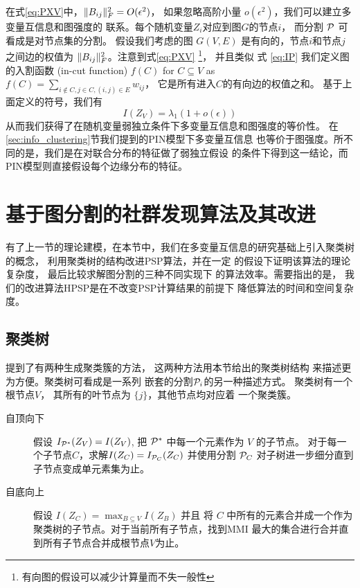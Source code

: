 在式\eqref{eq:PXV}中，$\norm{B_{ij}}_F^2 =O(\epsilon^2)$，
如果忽略高阶小量 $o(\epsilon^2)$，我们可以建立多变量互信息和图强度的
联系。每个随机变量$Z_i$对应到图$G$的节点$i$，
而分割 $\P$
可看成是对节点集的分割。
假设我们考虑的图 $G(V, E)$ 是有向的，节点$i$和节点$j$之间边的权值为
$\norm{B_{ij}}_F^2$。注意到式\eqref{eq:PXV}
\footnote{有向图的假设可以减少计算量而不失一般性}，
并且类似 式 \ref{eq:IP} 我们定义图的入割函数 (in-cut function) $f(C)$ for $C\subseteq V$ as $f(C) = \sum_{i\not\in C, j\in C, (i,j) \in E} w_{ij}$，
它是所有进入$C$的有向边的权值之和。
基于上面定义的符号，我们有
\begin{equation}\label{eq:PXV_Data_Simplified}
I(Z_V) = \lambda_1 (1 + o(\epsilon))
\end{equation}
从而我们获得了在随机变量弱独立条件下多变量互信息和图强度的等价性。
在\ref{sec:info_clustering}节我们提到的PIN模型下多变量互信息
也等价于图强度。所不同的是，我们是在对联合分布的特征做了弱独立假设
的条件下得到这一结论，而PIN模型则直接假设每个边缘分布的特征。

\section{基于图分割的社群发现算法及其改进}
有了上一节的理论建模，在本节中，我们在多变量互信息的研究基础上引入聚类树的概念，
利用聚类树的结构改进PSP算法，并在一定
的假设下证明该算法的理论复杂度，
最后比较求解图分割的三种不同实现下
的算法效率。需要指出的是，
我们的改进算法HPSP是在不改变PSP计算结果的前提下
降低算法的时间和空间复杂度。
\subsection{聚类树}

\citet{chan2020agglomerative} 提到了有两种生成聚类簇的方法，
这两种方法用本节给出的聚类树结构
来描述更为方便。聚类树可看成是一系列
嵌套的分割$\P_i$的另一种描述方式。
聚类树有一个根节点$V$，
其所有的叶节点为 $\{j\}$，其他节点均对应着
一个聚类簇。

\begin{description}
  \item[自顶向下] 假设 $I_{\P^*}(Z_V)=I(Z_V)$, 
  把 $\P^*$ 中每一个元素作为 $V$ 的子节点。
  对于每一个子节点$C$，求解$I(Z_C)=I_{\P_C}(Z_C)$
  并使用分割 $\P_C$ 对子树进一步细分直到子节点变成单元素集为止。
  \item[自底向上\footnotemark] 假设 $I(Z_C) = \max_{B\subseteq V} I(Z_B)$ 并且 
  将 $C$ 中所有的元素合并成一个作为聚类树的子节点。对于当前所有子节点，找到MMI
  最大的集合进行合并直到所有子节点合并成根节点$V$为止。
  \end{description}


